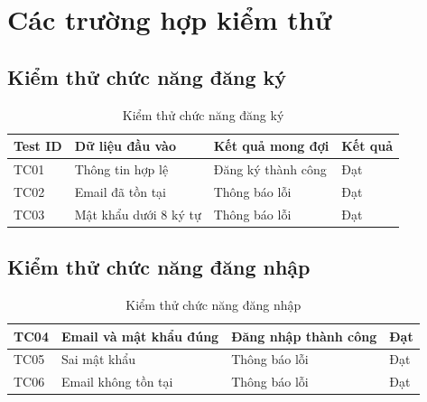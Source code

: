 
\section{Các trường hợp kiểm thử}

\subsection{Kiểm thử chức năng đăng ký}

\begin{table}[H]
\centering
\caption{Kiểm thử chức năng đăng ký}
\begin{tabular}{|p{2cm}|p{4cm}|p{4cm}|p{4cm}|}
\hline

\textbf{Test ID}
&
\textbf{Dữ liệu đầu vào}
&
\textbf{Kết quả mong đợi}
&
\textbf{Kết quả}
\\
\hline

TC01
&
Thông tin hợp lệ
&
Đăng ký thành công
&
Đạt
\\
\hline

TC02
&
Email đã tồn tại
&
Thông báo lỗi
&
Đạt
\\
\hline

TC03
&
Mật khẩu dưới 8 ký tự
&
Thông báo lỗi
&
Đạt
\\
\hline

\end{tabular}

\end{table}


\subsection{Kiểm thử chức năng đăng nhập}

\begin{table}[H]
\centering
\caption{Kiểm thử chức năng đăng nhập}

\begin{tabular}{|p{2cm}|p{4cm}|p{4cm}|p{4cm}|}

\hline

TC04
&
Email và mật khẩu đúng
&
Đăng nhập thành công
&
Đạt
\\
\hline

TC05
&
Sai mật khẩu
&
Thông báo lỗi
&
Đạt
\\
\hline

TC06
&
Email không tồn tại
&
Thông báo lỗi
&
Đạt
\\
\hline

\end{tabular}

\end{table}


